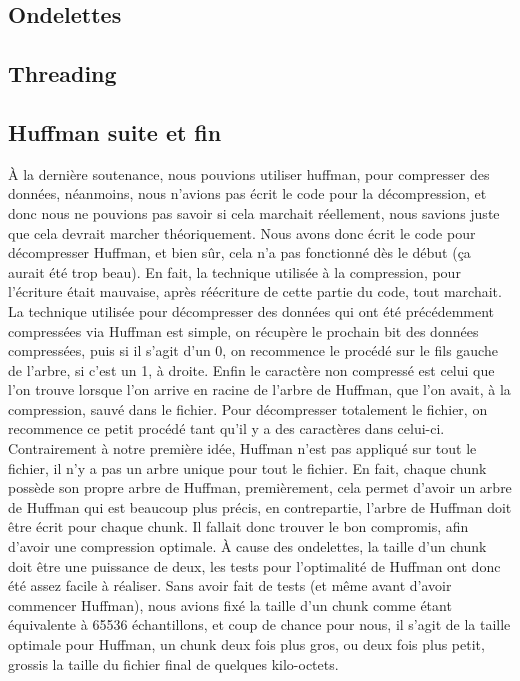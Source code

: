 \documentclass[a4paper,12pt]{article}
\begin{document}
	\subsection{Ondelettes}
	\subsection{Threading}
	\subsection{Huffman suite et fin}
À la dernière soutenance, nous pouvions utiliser huffman, pour compresser des
données, néanmoins, nous n'avions pas écrit le code pour la décompression, et
donc nous ne pouvions pas savoir si cela marchait réellement, nous savions juste
que cela devrait marcher théoriquement. Nous avons donc écrit le code pour
décompresser Huffman, et bien sûr, cela n'a pas fonctionné dès le début (ça
aurait été trop beau). En fait, la technique utilisée à la compression, pour
l'écriture était mauvaise, après réécriture de cette partie du code, tout
marchait.\\
La technique utilisée pour décompresser des données qui ont été précédemment
compressées via Huffman est simple, on récupère le prochain bit des données
compressées, puis si il s'agit d'un 0, on recommence le procédé sur le fils
gauche de l'arbre, si c'est un 1, à droite. Enfin le caractère non compressé est
celui que l'on trouve lorsque l'on arrive en racine de l'arbre de Huffman, que
l'on avait, à la compression, sauvé dans le fichier. Pour décompresser
totalement le fichier, on recommence ce petit
procédé tant qu'il y a des caractères dans celui-ci.\\
Contrairement à notre première idée, Huffman n'est pas appliqué sur tout le
fichier, il n'y a pas un arbre unique pour tout le fichier. En fait, chaque
chunk possède son propre arbre de Huffman, premièrement, cela permet d'avoir un
arbre de Huffman qui est beaucoup plus précis, en contrepartie, l'arbre de
Huffman doit être écrit pour chaque chunk. Il fallait donc trouver le bon
compromis, afin d'avoir une compression optimale. À cause des ondelettes, la
taille d'un chunk doit être une puissance de deux, les tests pour l'optimalité
de Huffman ont donc été assez facile à réaliser. Sans avoir fait de tests (et
même avant d'avoir commencer Huffman), nous avions fixé la taille d'un chunk
comme étant équivalente à 65536 échantillons, et coup de chance pour nous, il
s'agit de la taille optimale pour Huffman, un chunk deux fois plus gros, ou deux
fois plus petit, grossis la taille du fichier final de quelques
kilo-octets.\\
\end{document}

